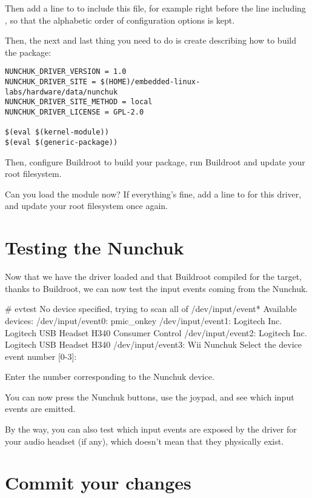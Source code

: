 Then add a line to  to include this file, for example right
before the line including ,
so that the alphabetic order of configuration options is kept.

Then, the next and last thing you need to do is create
 describing how to build
the package:

\begin{verbatim}
NUNCHUK_DRIVER_VERSION = 1.0
NUNCHUK_DRIVER_SITE = $(HOME)/embedded-linux-labs/hardware/data/nunchuk
NUNCHUK_DRIVER_SITE_METHOD = local
NUNCHUK_DRIVER_LICENSE = GPL-2.0

$(eval $(kernel-module))
$(eval $(generic-package))
\end{verbatim}

Then, configure Buildroot to build your package, run Buildroot and
update your root filesystem.

Can you load the  module now? If everything's fine, add a
line to  for this driver, and update your
root filesystem once again.

\section{Testing the Nunchuk}

Now that we have the  driver loaded and that Buildroot compiled
 for the target, thanks to Buildroot, we can now test the input
events coming from the Nunchuk.

\begin{bashinput}
# evtest
No device specified, trying to scan all of /dev/input/event*
Available devices:
/dev/input/event0:	pmic_onkey
/dev/input/event1:	Logitech Inc. Logitech USB Headset H340 Consumer Control
/dev/input/event2:	Logitech Inc. Logitech USB Headset H340
/dev/input/event3:	Wii Nunchuk
Select the device event number [0-3]:
\end{bashinput}

Enter the number corresponding to the Nunchuk device.

You can now press the Nunchuk buttons, use the joypad, and see which
input events are emitted.

By the way, you can also test which input events are exposed by the
driver for your audio headset (if any), which doesn't mean that they physically
exist.

\section{Commit your changes}


